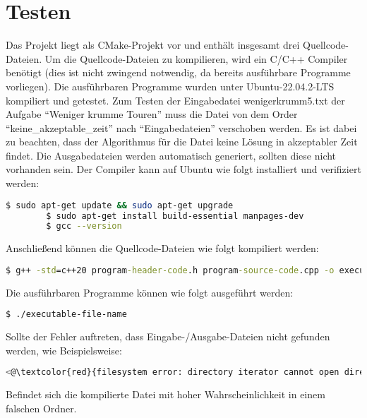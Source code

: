 \documentclass[a4paper,10pt,ngerman]{scrartcl}
\begin{document}
    \section{Testen}\label{sec:testen}
    Das Projekt liegt als CMake-Projekt vor und enthält insgesamt drei Quellcode-Dateien.
    Um die Quellcode-Dateien zu kompilieren, wird ein C/C++ Compiler benötigt
    (dies ist nicht zwingend notwendig, da bereits ausführbare Programme vorliegen).
    Die ausführbaren Programme wurden unter Ubuntu-22.04.2-LTS kompiliert und getestet.
    Zum Testen der Eingabedatei wenigerkrumm5.txt der Aufgabe ``Weniger krumme Touren''
    muss die Datei von dem Order ``keine\_akzeptable\_zeit'' nach ``Eingabedateien'' verschoben werden.
    Es ist dabei zu beachten, dass der Algorithmus für die Datei keine Lösung in akzeptabler Zeit findet.
    Die Ausgabedateien werden automatisch generiert, sollten diese nicht vorhanden sein.
    \newpage
    Der Compiler kann auf Ubuntu wie folgt installiert und verifiziert werden:
    \begin{lstlisting}[language=bash,label={lst:install}]
        $ sudo apt-get update && sudo apt-get upgrade
        $ sudo apt-get install build-essential manpages-dev
        $ gcc --version
    \end{lstlisting}
    Anschließend können die Quellcode-Dateien wie folgt kompiliert werden:
    \begin{lstlisting}[language=cmd,label={lst:compile}]
        $ g++ -std=c++20 program-header-code.h program-source-code.cpp -o executable-file-name
    \end{lstlisting}
    Die ausführbaren Programme können wie folgt ausgeführt werden:
    \begin{lstlisting}[language=bash,label={lst:run}]
        $ ./executable-file-name
    \end{lstlisting}
    Sollte der Fehler auftreten, dass Eingabe-/Ausgabe-Dateien nicht gefunden werden,
    wie Beispielsweise:
    \begin{lstlisting}[language=bash,label={lst:error},color=blue]
       <@\textcolor{red}{filesystem error: directory iterator cannot open directory: No such file or directory}@>
    \end{lstlisting}
    Befindet sich die kompilierte Datei mit hoher Wahrscheinlichkeit in einem falschen Ordner.
\end{document}
